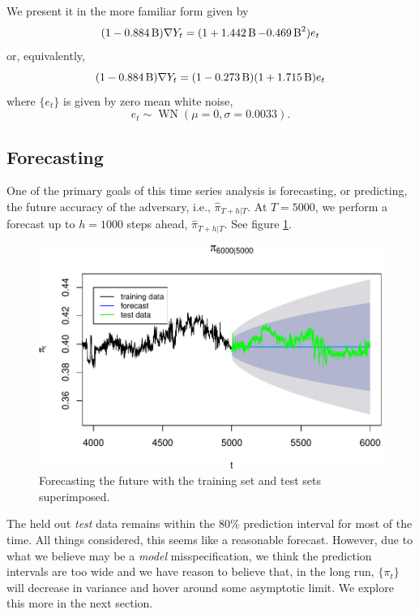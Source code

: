 \documentclass[final,
  11pt,
]{article}
\begin{document}
We present it in the more familiar form given by \[
  (1 - 0.884 \operatorname{B}) \nabla Y_t = (1 + 1.442 \operatorname{B} - 0.469 \operatorname{B}^2) e_t
\] or, equivalently, \[
  (1 - 0.884 \operatorname{B}) \nabla Y_t = (1 - 0.273 \operatorname{B}) (1 + 1.715 \operatorname{B}) e_t
\] where \(\{e_t\}\) is given by zero mean white noise, \[
  e_t \sim \operatorname{WN}(\mu=0,\sigma=0.0033).
\]

\hypertarget{forecasting}{%
\subsection{Forecasting}\label{forecasting}}

One of the primary goals of this time series analysis is forecasting, or
predicting, the future accuracy of the adversary, i.e.,
\(\hat{\pi}_{T+h|T}\).
At \(T=5000\), we perform a forecast up to
\(h=1000\) steps ahead, \(\hat{\pi}_{T+h|T}\).
See figure \ref{fig:forecast}.

\begin{figure}
\includegraphics{paper_files/figure-latex/unnamed-chunk-16-1.pdf}
\caption{Forecasting the future with the training set and test sets superimposed.}
\label{fig:forecast}
\end{figure}

The held out \emph{test} data remains within the \(80\%\) prediction
interval for most of the time. All things considered, this seems like a
reasonable forecast. However, due to what we believe may be a
\emph{model} misspecification, we think the prediction intervals are too
wide and we have reason to believe that, in the long run, \(\{\pi_t\}\)
will decrease in variance and hover around some asymptotic limit. We
explore this more in the next section.
\end{document}
